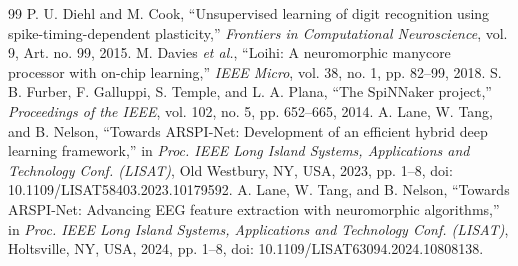 \documentclass[journal]{IEEEtran}
\begin{document}
\begin{thebibliography}{99}
 P. U. Diehl and M. Cook, ``Unsupervised learning of digit recognition using spike-timing-dependent plasticity,'' \emph{Frontiers in Computational Neuroscience}, vol. 9, Art. no. 99, 2015.
 M. Davies \emph{et al.}, ``Loihi: A neuromorphic manycore processor with on-chip learning,'' \emph{IEEE Micro}, vol. 38, no. 1, pp. 82--99, 2018.
 S. B. Furber, F. Galluppi, S. Temple, and L. A. Plana, ``The SpiNNaker project,'' \emph{Proceedings of the IEEE}, vol. 102, no. 5, pp. 652--665, 2014.
 A. Lane, W. Tang, and B. Nelson, ``Towards ARSPI-Net: Development of an efficient hybrid deep learning framework,'' in \emph{Proc. IEEE Long Island Systems, Applications and Technology Conf. (LISAT)}, Old Westbury, NY, USA, 2023, pp. 1--8, doi: 10.1109/LISAT58403.2023.10179592.
 A. Lane, W. Tang, and B. Nelson, ``Towards ARSPI-Net: Advancing EEG feature extraction with neuromorphic algorithms,'' in \emph{Proc. IEEE Long Island Systems, Applications and Technology Conf. (LISAT)}, Holtsville, NY, USA, 2024, pp. 1--8, doi: 10.1109/LISAT63094.2024.10808138.
\end{thebibliography}
\end{document}
